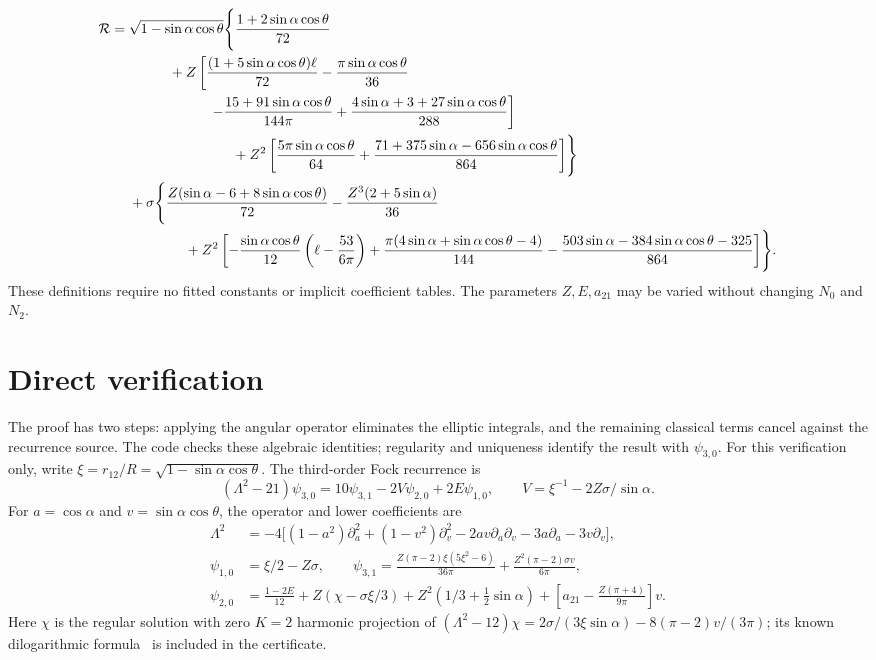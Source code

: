 \documentclass[10pt]{article}
\begin{document}
\begin{equation}\label{eq:remainder}
\begin{aligned}
 \mathcal R={}&\sqrt{1-\sin\alpha\cos\theta}\Biggl\{\frac{1+2\sin\alpha\cos\theta}{72}\\ &\hspace{10mm}
 +Z\left[\frac{(1+5\sin\alpha\cos\theta)\ell}{72}-\frac{\pi\sin\alpha\cos\theta}{36}
 \right.\\ &\hspace{20mm}\left.-\frac{15+91\sin\alpha\cos\theta}{144\pi}+\frac{4\sin\alpha+3+27\sin\alpha\cos\theta}{288}\right]\\
 &\hspace{26mm}+Z^2\left[\frac{5\pi\sin\alpha\cos\theta}{64}
 +\frac{71+375\sin\alpha-656\sin\alpha\cos\theta}{864}\right]\Biggr\}\\
 &+\sigma\Biggl\{\frac{Z(\sin\alpha-6+8\sin\alpha\cos\theta)}{72}-\frac{Z^3(2+5\sin\alpha)}{36}\\
 &\hspace{14mm}+Z^2\left[-\frac{\sin\alpha\cos\theta}{12}\left(\ell-\frac{53}{6\pi}\right)
 +\frac{\pi(4\sin\alpha+\sin\alpha\cos\theta-4)}{144}
 -\frac{503\sin\alpha-384\sin\alpha\cos\theta-325}{864}\right]\Biggr\}.
\end{aligned}
\end{equation}
These definitions require no fitted constants or implicit coefficient tables.
The parameters $Z,E,a_{21}$ may be varied without changing $N_0$ and $N_2$.

\section{Direct verification}
The proof has two steps: applying the angular operator eliminates the elliptic integrals, and the remaining classical terms cancel against the recurrence source.
The code checks these algebraic identities; regularity and uniqueness identify the result with $\psi_{3,0}$.
For this verification only, write $\xi=r_{12}/R=\sqrt{1-\sin\alpha\cos\theta}$.
The third-order Fock recurrence is
\begin{equation}\label{eq:recurrence}
 (\Lambda^2-21)\psi_{3,0}=10\psi_{3,1}-2V\psi_{2,0}+2E\psi_{1,0},\qquad
 V=\xi^{-1}-2Z\sigma/\sin\alpha.
\end{equation}
For $a=\cos\alpha$ and $v=\sin\alpha\cos\theta$, the operator and lower coefficients are
\begin{align}
 \Lambda^2&=-4\bigl[(1-a^2)\partial_a^2+(1-v^2)\partial_v^2-2av\partial_a\partial_v-3a\partial_a-3v\partial_v\bigr],\\
 \psi_{1,0}&=\xi/2-Z\sigma,\qquad
 \psi_{3,1}=\frac{Z(\pi-2)\xi(5\xi^2-6)}{36\pi}+\frac{Z^2(\pi-2)\sigma v}{6\pi},\nonumber\\
 \psi_{2,0}&=\frac{1-2E}{12}+Z(\chi-\sigma\xi/3)+Z^2(1/3+\tfrac12\sin\alpha)
 +\left[a_{21}-\frac{Z(\pi+4)}{9\pi}\right]v.\nonumber
\end{align}
Here $\chi$ is the regular solution with zero $K=2$ harmonic projection of
$(\Lambda^2-12)\chi=2\sigma/(3\xi\sin\alpha)-8(\pi-2)v/(3\pi)$; its known dilogarithmic formula~\cite{LB2015} is included in the certificate.
\end{document}
